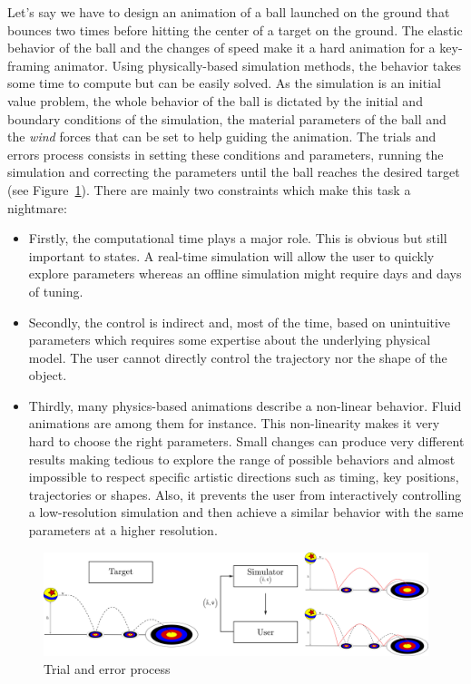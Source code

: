 Let's say we have to design an animation of a ball launched on the ground that bounces two times before hitting the center of a target on the ground. 
The elastic behavior of the ball and the changes of speed make it a hard animation for a key-framing animator. 
Using physically-based simulation methods, the behavior takes some time to compute but can be easily solved.
As the simulation is an initial value problem, the whole behavior of the ball is dictated by the initial and boundary conditions of the simulation, the material parameters of the ball and the \emph{wind} forces that can be set to help guiding the animation. 
The trials and errors process consists in setting these conditions and parameters, running the simulation and correcting the parameters until the ball reaches the desired target (see Figure~\ref{fig:trialErrorProcess}). 
There are mainly two constraints which make this task a nightmare:
\begin{itemize}
	\item Firstly, the computational time plays a major role. 
	This is obvious but still important to states. 
	A real-time simulation will allow the user to quickly explore parameters whereas an offline simulation might require days and days of tuning.
	\item Secondly, the control is indirect and, most of the time, based on unintuitive parameters which requires some expertise about the underlying physical model. The user cannot directly control the trajectory nor the shape of the object.
	\item Thirdly, many physics-based animations describe a non-linear behavior. Fluid animations are among them for instance. 
	This non-linearity makes it very hard to choose the right parameters. 
	Small changes can produce very different results making tedious to explore the range of possible behaviors and almost impossible to respect specific artistic directions such as timing, key positions, trajectories or shapes. 
	Also, it prevents the user from interactively controlling a low-resolution simulation and then achieve a similar behavior with the same parameters at a higher resolution.
\end{itemize}

\begin{figure}[!h]
	\centering
	\includegraphics[scale=0.20]{./images/simulationControl/trialError.png}
	\caption[STAR control: Trial and error process]{\label{fig:trialErrorProcess}Trial and error process}
\end{figure}

